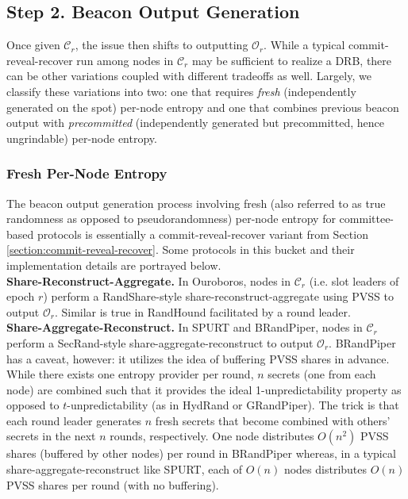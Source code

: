 \documentclass[conference]{IEEEtran}
\theoremstyle{definition}
\theoremstyle{remark}
\begin{document}
\subsection{Step 2. Beacon Output Generation}
\label{subsection:beacon-output-generation}
Once given $\mathcal{C}_r$, the issue then shifts to outputting $\mathcal{O}_r$. While a typical commit-reveal-recover run among nodes in $\mathcal{C}_r$ may be sufficient to realize a DRB, there can be other variations coupled with different tradeoffs as well. Largely, we classify these variations into two: one that requires \textit{fresh} (independently generated on the spot) per-node entropy and one that combines previous beacon output with \textit{precommitted} (independently generated but precommitted, hence ungrindable) per-node entropy.

\subsubsection{Fresh Per-Node Entropy}
\label{subsubsection:fresh}
The beacon output generation process involving fresh (also referred to as true randomness \cite{cascudomt, das2021spurt} as opposed to pseudorandomness) per-node entropy for committee-based protocols is essentially a commit-reveal-recover variant from Section \ref{section:commit-reveal-recover}. Some protocols in this bucket and their implementation details are portrayed below.\\

\noindent\textbf{Share-Reconstruct-Aggregate.} In Ouroboros, nodes in $\mathcal{C}_r$ (i.e. slot leaders of epoch $r$) perform a RandShare-style share-reconstruct-aggregate using PVSS to output $\mathcal{O}_r$. Similar is true in RandHound facilitated by a round leader.\\

\noindent\textbf{Share-Aggregate-Reconstruct.} In SPURT and BRandPiper, nodes in $\mathcal{C}_r$ perform a SecRand-style share-aggregate-reconstruct to output $\mathcal{O}_r$. BRandPiper has a caveat, however: it utilizes the idea of buffering PVSS shares in advance. While there exists one entropy provider per round, $n$ secrets (one from each node) are combined such that it provides the ideal 1-unpredictability property as opposed to $t$-unpredictability (as in HydRand or GRandPiper). The trick is that each round leader generates $n$ fresh secrets that become combined with others' secrets in the next $n$ rounds, respectively. One node distributes $O(n^2)$ PVSS shares (buffered by other nodes) per round in BRandPiper whereas, in a typical share-aggregate-reconstruct like SPURT, each of $O(n)$ nodes distributes $O(n)$ PVSS shares per round (with no buffering).\\
\end{document}
